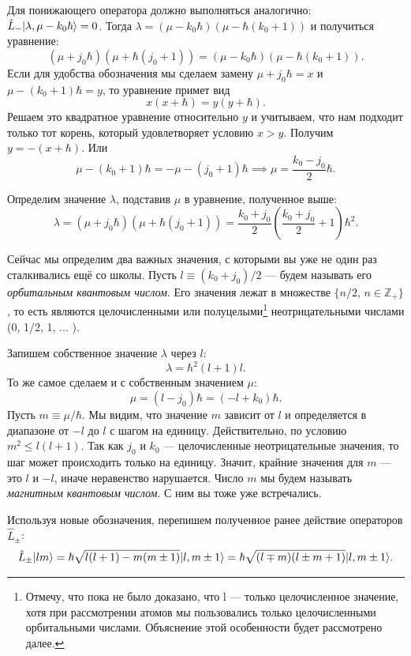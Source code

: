 Для понижающего оператора должно выполняться аналогично:
$\hat{L}_-\lvert\lambda,\mu - k_0\hbar\rangle = 0$. Тогда $\lambda = (\mu -
  k_0\hbar)(\mu-\hbar(k_0 + 1))$ и получиться уравнение:
\[
  (\mu + j_0\hbar)(\mu + \hbar(j_0 + 1))=(\mu - k_0\hbar)(\mu-\hbar(k_0 + 1)).
\]
Если для удобства обозначения мы сделаем замену $\mu + j_0\hbar = x$ и $\mu -
  (k_0 + 1)\hbar = y$, то уравнение примет вид
\[
  x(x+\hbar) = y(y+\hbar).
\]
Решаем это квадратное уравнение относительно $y$ и учитываем, что нам подходит
только тот корень, который удовлетворяет условию $x > y$. Получим $y = -(x +
  \hbar)$. Или
\[
  \mu - (k_0 + 1)\hbar = -\mu - (j_0 + 1)\hbar \implies \mu = \frac{k_0 - j_0}{2}\hbar.
\]

Определим значение $\lambda$, подставив $\mu$ в уравнение, полученное выше:
\[
  \lambda = (\mu + j_0\hbar)(\mu + \hbar(j_0+1)) = \frac{k_0 + j_0}{2}\left(\frac{k_0 + j_0}{2} + 1\right)\hbar^2.
\]

Сейчас мы определим два важных значения, с которыми вы уже не один раз
сталкивались ещё со школы. Пусть $l\equiv (k_0 + j_0)/2$ --- будем называть его
\textit{орбитальным квантовым числом}. Его значения лежат в множестве $\{n/2,\,
  n\in \mathbb{Z}_+\}$, то есть являются целочисленными или
полуцелыми\footnote[1]{Отмечу, что пока не было доказано, что l --- только
  целочисленное значение, хотя при рассмотрении атомов мы пользовались только
  целочисленными орбитальными числами. Объяснение этой особенности будет
  рассмотрено далее.} неотрицательными числами (0, 1/2, 1, ... ).

Запишем собственное значение $\lambda$ через $l$:
\[
  \lambda = \hbar^2(l+1)l.
\]
То же самое сделаем и с собственным значением $\mu$:
\[
  \mu = (l - j_0)\hbar = (-l + k_0)\hbar.
\]
Пусть $m \equiv \mu/\hbar$. Мы видим, что значение $m$ зависит от $l$ и
определяется в диапазоне от $-l$ до $l$ с шагом на единицу. Действительно, по
условию $m^2 \leq l(l+1)$. Так как $j_0$ и $k_0$ --- целочисленные
неотрицательные значения, то шаг может происходить только на единицу. Значит,
крайние значения для $m$ --- это $l$ и $-l$, иначе неравенство нарушается.
Число $m$ мы будем называть \textit{магнитным квантовым числом}. С ним вы тоже
уже встречались.

Используя новые обозначения, перепишем полученное ранее действие операторов
$\hat{L}_{\pm}$:
\[
  \hat{L}_{\pm}\lvert lm\rangle = \hbar\sqrt{l(l+1) - m(m \pm 1)}\lvert l, m \pm 1\rangle = \hbar\sqrt{(l \mp m)(l \pm m + 1)}\lvert l,m\pm 1\rangle.
\]

